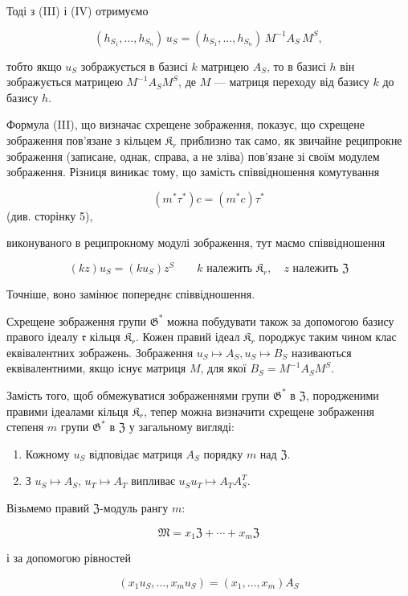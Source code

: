 \documentclass[11pt]{article}
\begin{document}
Тоді з (III) і (IV) отримуємо

\[(h_{S_1},\ldots,h_{S_n})\,u_S=(h_{S_1},\ldots,h_{S_n})\,M^{-1}A_S\,M^S,\]

тобто якщо \(u_S\) зображується в базисі \(k\) матрицею \(A_S\), то в базисі \(h\) він зображується матрицею \(M^{-1}A_SM^S\), де \(M\) --- матриця переходу від базису \(k\) до базису \(h\).

Формула (III), що визначає схрещене зображення, показує, що схрещене зображення пов'язане з кільцем \(\mathfrak K_r\) приблизно так само, як звичайне реципрокне зображення (записане, однак, справа, а не зліва) пов'язане зі своїм модулем зображення. Різниця виникає тому, що замість співвідношення комутування

\[(m^*\tau^*)c = (m^*c)\tau^*\]
(див. сторінку 5),

виконуваного в реципрокному модулі зображення, тут маємо співвідношення

\[
(kz)u_S=(ku_S)z^S\qquad k\text{ належить }\mathfrak K_r,\quad z\text{ належить }\mathfrak Z
\]

Точніше, воно замінює попереднє співвідношення.

Схрещене зображення групи \(\mathfrak{G}^*\) можна побудувати також за допомогою базису правого ідеалу \(\mathfrak r\) кільця \(\mathfrak{K}_r\). Кожен правий ідеал \(\mathfrak{K}_r\) породжує таким чином клас еквівалентних зображень. Зображення \(u_S \mapsto A_S, u_S \mapsto B_S\) називаються еквівалентними, якщо існує матриця \(M\), для якої \(B_S = M^{-1}A_SM^S\).

Замість того, щоб обмежуватися зображеннями групи \(\mathfrak G^*\) в \(\mathfrak Z\), породженими правими ідеалами кільця \(\mathfrak K_r\), тепер можна визначити схрещене зображення степеня \(m\) групи \(\mathfrak G^*\) в \(\mathfrak Z\) у загальному вигляді:

\begin{enumerate}
\item Кожному \(u_S\) відповідає матриця \(A_S\) порядку \(m\) над \(\mathfrak Z\).
\item З \(u_S \mapsto A_S\), \(u_T \mapsto A_T\) випливає \(u_Su_T \mapsto A_TA_S^T\).
\end{enumerate}

Візьмемо правий \(\mathfrak Z\)-модуль рангу \(m\):

\[\mathfrak{M}=x_1\mathfrak{Z}+\cdots+x_m\mathfrak{Z}\]

і за допомогою рівностей

\[(x_1u_S,\ldots,x_mu_S)=(x_1,\ldots,x_m)A_S\]
\end{document}
